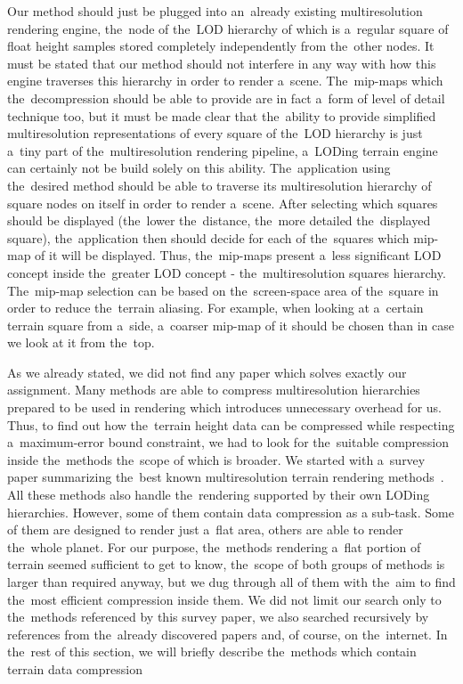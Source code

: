Our method should just be plugged into an~already existing multiresolution rendering engine, the~node of the~LOD hierarchy of which is a~regular square of float height samples stored completely independently from the~other nodes. It must be stated that our method should not interfere in any way with how this engine traverses this hierarchy in order to render a~scene. The~mip-maps which the~decompression should be able to provide are in fact a~form of level of detail technique too, but it must be made clear that the~ability to provide simplified multiresolution representations of every square of the~LOD hierarchy is just a~tiny part of the~multiresolution rendering pipeline, a~LODing terrain engine can certainly not be build solely on this ability. The~application using the~desired method should be able to traverse its multiresolution hierarchy of square nodes on itself in order to render a~scene. After selecting which squares should be displayed (the~lower the~distance, the~more detailed the~displayed square), the~application then should decide for each of the~squares which mip-map of it will be displayed. Thus, the~mip-maps present a~less significant LOD concept inside the~greater LOD concept - the~multiresolution squares hierarchy. The~mip-map selection can be based on the~screen-space area of the~square in order to reduce the~terrain aliasing. For example, when looking at a~certain terrain square from a~side, a~coarser mip-map of it should be chosen than in case we look at it from the~top.

As we already stated, we did not find any paper which solves exactly our assignment. Many methods are able to compress multiresolution hierarchies prepared to be used in rendering which introduces unnecessary overhead for us. Thus, to find out how the~terrain height data can be compressed while respecting a~maximum-error bound constraint, we had to look for the~suitable compression inside the~methods the~scope of which is broader. We started with a~survey paper summarizing the~best known multiresolution terrain rendering methods~\cite{survey}. All these methods also handle the~rendering supported by their own LODing hierarchies. However, some of them contain data compression as a sub-task. Some of them are designed to render just a~flat area, others are able to render the~whole planet. For our purpose, the~methods rendering a~flat portion of terrain seemed sufficient to get to know, the~scope of both groups of methods is larger than required anyway, but we dug through all of them with the~aim to find the~most efficient compression inside them. We did not limit our search only to the~methods referenced by this survey paper, we also searched recursively by references from the~already discovered papers and, of course, on the~internet. In the~rest of this section, we will briefly describe the~methods which contain terrain data compression

